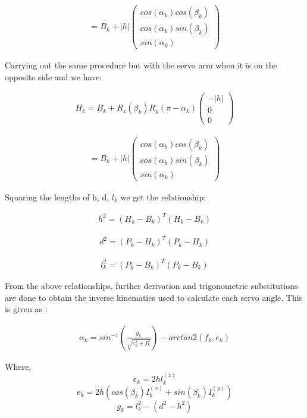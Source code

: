 \begin{ceqn}
	\begin{align}
		= B_{k} + |h|\begin{pmatrix}
			             cos(\alpha_{k})cos(\beta_{k}) \\
			             cos(\alpha_{k})sin(\beta_{k}) \\
			             sin(\alpha_{k})
		             \end{pmatrix}
		\label{eq:myeqn4}
	\end{align}
\end{ceqn}
Carrying out the same procedure but with the servo arm when it is on the opposite side and we have:
\begin{ceqn}
	\begin{align}
		H_{k} = B_{k} + R_{z}(\beta_{k}) R_{y}(\pi -\alpha_{k})\begin{pmatrix}
			                                                       -|h| \\ 0 \\ 0
		                                                       \end{pmatrix}
		\label{eq:myeqn5}
	\end{align}
\end{ceqn}
\begin{ceqn}
	\begin{align}
		= B_{k} + |h|\begin{pmatrix}
			             cos(\alpha_{k})cos(\beta_{k}) \\
			             cos(\alpha_{k})sin(\beta_{k}) \\
			             sin(\alpha_{k})
		             \end{pmatrix}
		\label{eq:myeqn6}
	\end{align}
\end{ceqn}
Squaring the lengths of h, d, $l_{k}$ we get the relationship:
\begin{ceqn}
	\begin{align}
		h^2 = (H_{k}-B_{k})^{T}(H_{k}-B_{k})
	\end{align}
\end{ceqn}
\begin{ceqn}
	\begin{align}
		d^2 = (P_{k}-H_{k})^{T}(P_{k}-H_{k})
	\end{align}
\end{ceqn}
\begin{ceqn}
	\begin{align}
		l_{k}^2 = (P_{k}-B_{k})^{T}(P_{k}-B_{k})
	\end{align}
\end{ceqn}
From the above relationships, further derivation and trigonometric substitutions are done to obtain the inverse kinematics used to calculate each servo angle. This is given as \cite{Eisele_2019}:
\begin{ceqn}
	\begin{align}
		\alpha_{k} = sin^{-1}(\frac{g_{k}}{\sqrt{e_{k}^2+f_{k}^2}})-arctan2(f_{k}, e_{k})
	\end{align}
\end{ceqn}
Where,
$$e_{k} = 2hl_{k}^{(z)} $$
$$e_{k} = 2h(cos(\beta_{k})I_{k}^{(x)}+sin({\beta_{k}})I_{k}^(y))$$
$$g_{k} = l_{k}^2 - (d^2 - h^2)   $$

